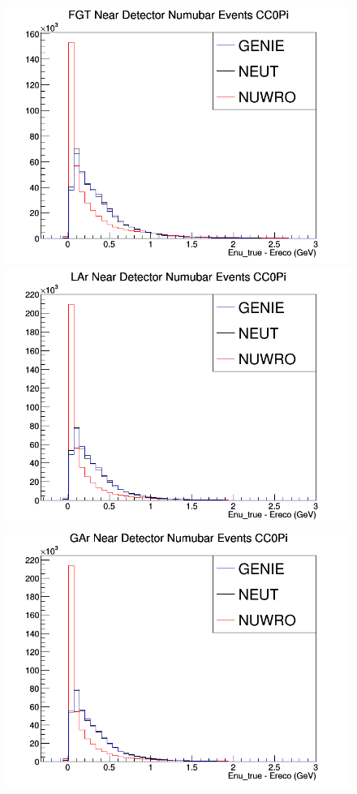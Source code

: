 \documentclass[12pt]{article}
\begin{document}
\begin{figure}[h]
\endminipage
{}
\includegraphics[width=\linewidth]{Ereco_Etrue/numubar_FGT_CC0Pi.png}
\endminipage
{}
\includegraphics[width=\linewidth]{Ereco_Etrue/numubar_LAr_CC0Pi.png}
\endminipage
{}
\includegraphics[width=\linewidth]{Ereco_Etrue/numubar_GAr_CC0Pi.png}

\end{figure}
\end{document}
